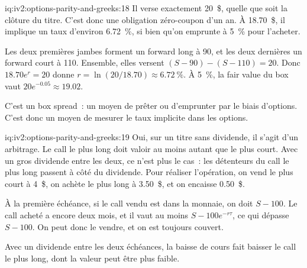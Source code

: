 \begin{solution}{iq:iv2:options-parity-and-greeks:18}
Il verse exactement 20~\$, quelle que soit la clôture du titre. C'est donc une obligation zéro-coupon d'un an. À 18.70~\$, il implique un taux d'environ 6.72~\%, si bien qu'on emprunte à 5~\% pour l'acheter.

Les deux premières jambes forment un forward long à 90, et les deux dernières un forward court à 110. Ensemble, elles versent $(S - 90) - (S - 110) = 20$. Donc $18.70e^{r} = 20$ donne $r = \ln(20/18.70) \approx 6.72~\%$. À 5~\%, la fair value du box vaut $20e^{-0.05} \approx 19.02$.

C'est un box spread~: un moyen de prêter ou d'emprunter par le biais d'options. C'est donc un moyen de mesurer le taux implicite dans les options.

\end{solution}

\begin{solution}{iq:iv2:options-parity-and-greeks:19}
Oui, sur un titre sans dividende, il s'agit d'un arbitrage. Le call le plus long doit valoir au moins autant que le plus court. Avec un gros dividende entre les deux, ce n'est plus le cas~: les détenteurs du call le plus long passent à côté du dividende. Pour réaliser l'opération, on vend le plus court à 4~\$, on achète le plus long à 3.50~\$, et on encaisse 0.50~\$.

À la première échéance, si le call vendu est dans la monnaie, on doit $S - 100$. Le call acheté a encore deux mois, et il vaut au moins $S - 100e^{-r\tau}$, ce qui dépasse $S - 100$. On peut donc le vendre, et on est toujours couvert.

Avec un dividende entre les deux échéances, la baisse de cours fait baisser le call le plus long, dont la valeur peut être plus faible.

\end{solution}

